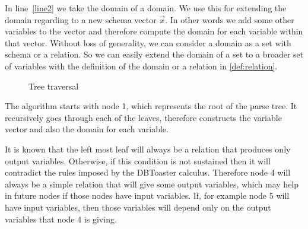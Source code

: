 \documentclass[12pt]{article}
\begin{document}
In line~\ref{line2} we take the domain of a domain. We use this for extending the domain regarding to a new schema vector $\vec x$. In other words we add some other variables to the vector and therefore compute the domain for each variable within that vector. Without loss of generality, we can consider a domain as a set with schema or a relation. So we can easily extend the domain of a set to a broader set of variables with the definition of the domain or a relation in \eqref{def:relation}. 

\begin{figure}[htbp]
\begin{center}
\end{center}
\caption{Tree traversal}
\label{fig1}
\end{figure}

	The algorithm starts with node 1, which represents the root of the parse tree. It recursively goes through each of the leaves, therefore constructs the variable vector and also the domain for each variable.
	
	It is known that the left most leaf will always be a relation that produces only output variables. Otherwise, if this condition is not sustained then it will contradict the rules imposed by the DBToaster calculus. Therefore node 4 will always be a simple relation that will give some output variables, which may help in future nodes if those nodes have input variables. If, for example node 5 will have input variables, then those variables will depend only on the output variables that node 4 is giving.
	
\end{document}
